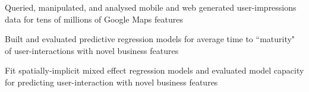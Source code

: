 \documentclass[]{deedy-resume-openfont}
\begin{document}
\begin{minipage}[t]{0.66\textwidth}
\begin{tightemize}
\item Queried, manipulated, and analysed mobile and web generated user-impressions data for tens of millions of Google Maps features %
\item Built and evaluated predictive regression models for average time to ``maturity" of user-interactions with novel business features
\item Fit spatially-implicit mixed effect regression models and evaluated model capacity for predicting user-interaction with novel business features
\end{tightemize}
\sectionsep



\end{minipage}
\end{document}
